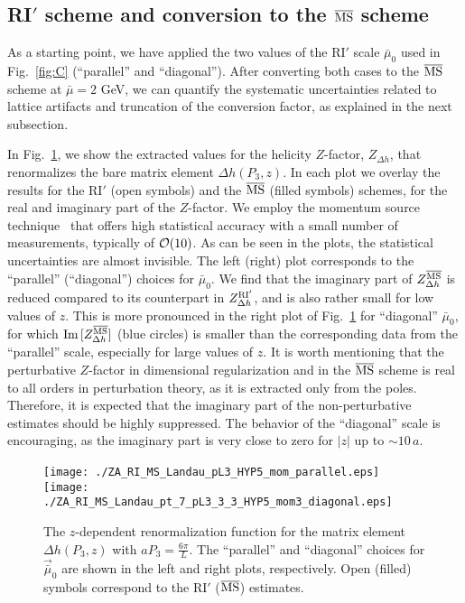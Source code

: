 \documentclass[12pt,tighten,nofootinbib,amssymb,floatfix]{article}
\newcommand{\MSb}{{\overline{\rm MS}}}
\renewcommand{\Im}{{\rm Im}\,}
\begin{document}
\subsection{RI$'$ scheme and conversion to the $\MSb$ scheme}

As a starting point, we have applied the two values of the RI$'$ scale $\bar\mu_0$ 
used in Fig.~\ref{fig:C} (``parallel'' and ``diagonal''). After converting both cases to the $\MSb$ scheme at $\bar\mu{=}2$ GeV,
we can quantify the systematic uncertainties related to lattice artifacts and truncation of the conversion factor, as explained in the next subsection. 

In Fig.~\ref{fig:ZA}, we show the extracted values for the helicity $Z$-factor, $Z_{\Delta h}$, that renormalizes the bare matrix element 
$\Delta h(P_3,z)$. In each plot we overlay the results for the RI$'$ (open symbols) and the $\MSb$ (filled symbols) schemes,
for the real and imaginary part of the $Z$-factor. We employ the momentum source technique~\cite{Gockeler:1998ye,Alexandrou:2015sea} that 
offers high statistical accuracy with a small number of measurements, typically of ${\cal O}(10)$. As can be seen in the plots, the statistical
uncertainties are almost invisible. The left (right) plot corresponds to the ``parallel'' (``diagonal'') choices for $\bar\mu_0$.  
%
We find that the imaginary part of $Z_{\Delta h}^{\overline{\rm MS}}$ is reduced compared to its counterpart in $Z_{\Delta h}^{\rm RI'}$, and is also rather small 
for low values of $z$. This is more pronounced in the right plot of Fig.~\ref{fig:ZA} for ``diagonal'' $\bar\mu_0$, for which $\Im[Z_{\Delta h}^{\MSb}]$ 
(blue circles) is smaller than the corresponding data from the ``parallel'' scale, especially for large values of $z$.
It is worth mentioning that the perturbative $Z$-factor in dimensional regularization and in the $\MSb$ scheme is real to 
all orders in perturbation theory, as it is extracted only from the poles. Therefore, it is expected that the imaginary part of the
non-perturbative estimates should be highly suppressed. The behavior of the ``diagonal'' scale is encouraging,
as the imaginary part is very close to zero for $|z|$ up to ${\sim}10\,a$.
\vspace*{0.25cm}

\begin{figure}[h]
\centering
\texttt{[image: ./ZA\_RI\_MS\_Landau\_pL3\_HYP5\_mom\_parallel.eps]}\,\,\,
\texttt{[image: ./ZA\_RI\_MS\_Landau\_pt\_7\_pL3\_3\_3\_HYP5\_mom3\_diagonal.eps]}
\vspace*{-0.5cm}
\begin{minipage}{15cm}
\hspace*{3cm}
\caption{\small{The $z$-dependent renormalization function for the matrix element $\Delta h(P_3,z)$ 
with $a P_3=\frac{6\pi}{L}$. The ``parallel'' and ``diagonal'' choices for $\vec{\bar{\mu}}_0$ are shown in the left and right
plots, respectively. Open (filled) symbols correspond to the RI$'$ ($\MSb$) estimates.}}
\label{fig:ZA}
\end{minipage}
\end{figure}
\end{document}

